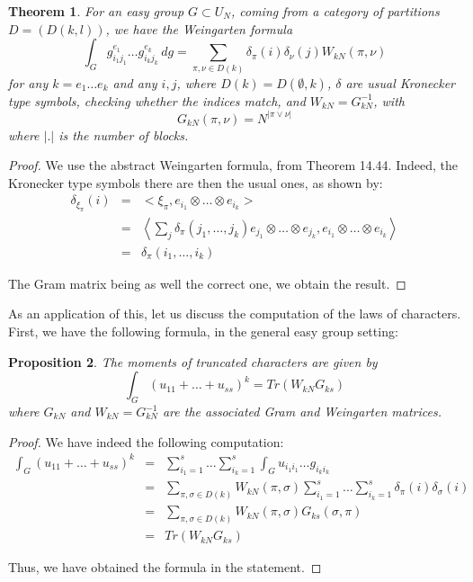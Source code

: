 \documentclass[12pt]{amsbook}
\newtheorem{theorem}{Theorem}[chapter]
\newtheorem{proposition}[theorem]{Proposition}
\begin{document}
\begin{theorem}
For an easy group $G\subset U_N$, coming from a category of partitions $D=(D(k,l))$, we have the Weingarten formula
$$\int_Gg_{i_1j_1}^{e_1}\ldots g_{i_kj_k}^{e_k}\,dg=\sum_{\pi,\nu\in D(k)}\delta_\pi(i)\delta_\nu(j)W_{kN}(\pi,\nu)$$
for any $k=e_1\ldots e_k$ and any $i,j$, where $D(k)=D(\emptyset,k)$, $\delta$ are usual Kronecker type symbols, checking whether the indices match, and $W_{kN}=G_{kN}^{-1}$, with 
$$G_{kN}(\pi,\nu)=N^{|\pi\vee\nu|}$$
where $|.|$ is the number of blocks. 
\end{theorem}

\begin{proof}
We use the abstract Weingarten formula, from Theorem 14.44. Indeed, the Kronecker type symbols there are then the usual ones, as shown by:
\begin{eqnarray*}
\delta_{\xi_\pi}(i)
&=&<\xi_\pi,e_{i_1}\otimes\ldots\otimes e_{i_k}>\\
&=&\left<\sum_j\delta_\pi(j_1,\ldots,j_k)e_{j_1}\otimes\ldots\otimes e_{j_k},e_{i_1}\otimes\ldots\otimes e_{i_k}\right>\\
&=&\delta_\pi(i_1,\ldots,i_k)
\end{eqnarray*}

The Gram matrix being as well the correct one, we obtain the result.
\end{proof}

As an application of this, let us discuss the computation of the laws of characters. First, we have the following formula, in the general easy group setting:

\begin{proposition}
The moments of truncated characters are given by
$$\int_G(u_{11}+\ldots +u_{ss})^k=Tr(W_{kN}G_{ks})$$
where $G_{kN}$ and $W_{kN}=G_{kN}^{-1}$ are the associated Gram and Weingarten matrices.
\end{proposition}

\begin{proof}
We have indeed the following computation:
\begin{eqnarray*}
\int_G(u_{11}+\ldots +u_{ss})^k
&=&\sum_{i_1=1}^{s}\ldots\sum_{i_k=1}^s\int_Gu_{i_1i_1}\ldots g_{i_ki_k}\\
&=&\sum_{\pi,\sigma\in D(k)}W_{kN}(\pi,\sigma)\sum_{i_1=1}^{s}\ldots\sum_{i_k=1}^s\delta_\pi(i)\delta_\sigma(i)\\
&=&\sum_{\pi,\sigma\in D(k)}W_{kN}(\pi,\sigma)G_{ks}(\sigma,\pi)\\
&=&Tr(W_{kN}G_{ks})
\end{eqnarray*}

Thus, we have obtained the formula in the statement.
\end{proof}
\end{document}
